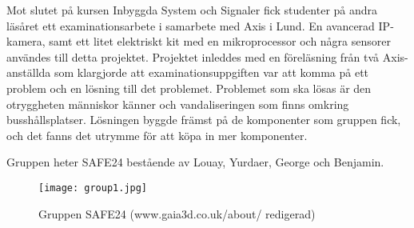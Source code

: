 



\begin{abstracts}        %
Mot slutet  på kursen Inbyggda System och Signaler fick studenter på andra läsåret ett examinationsarbete i samarbete med Axis i Lund. 
En avancerad IP-kamera, samt ett litet elektriskt
kit med en mikroprocessor och några sensorer användes till detta projektet. Projektet inleddes med en föreläsning från två Axis-anställda som klargjorde att examinationsuppgiften var att komma på ett problem och en lösning till det problemet.
Problemet som ska lösas är den otryggheten människor känner och vandaliseringen som finns omkring busshållsplatser. Lösningen byggde främst på
de komponenter som gruppen fick, och det fanns det utrymme för att köpa in mer komponenter.

Gruppen heter SAFE24 bestående av Louay, Yurdaer, George och Benjamin.

\begin{figure}[h]
  \texttt{[image: group1.jpg]}
  \caption{Gruppen SAFE24 (www.gaia3d.co.uk/about/ redigerad)}
  \label{fig:group1}
\end{figure}


\end{abstracts}


